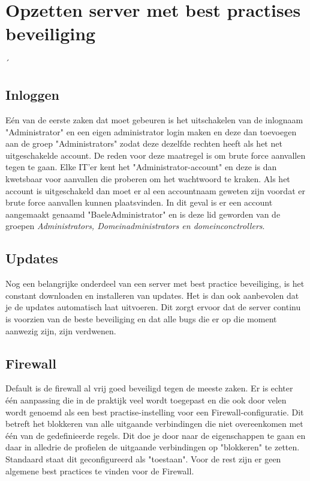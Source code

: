 \documentclass[pdftex,a4paper,12pt]{report}
\begin{document}
\chapter{Opzetten server met best practises beveiliging}
´%

\section{Inloggen}
Eén van de eerste zaken dat moet gebeuren is het uitschakelen van de inlognaam "Administrator" en een eigen administrator login maken en deze dan toevoegen aan de groep "Administrators" zodat deze dezelfde rechten heeft als het net uitgeschakelde account. De reden voor deze maatregel is om brute force aanvallen tegen te gaan. Elke IT'er kent het "Administrator-account" en deze is dan kwetsbaar voor aanvallen die proberen om het wachtwoord te kraken. Als het account is uitgeschakeld dan moet er al een accountnaam geweten zijn voordat er brute force aanvallen kunnen plaatsvinden. In dit geval is er een account aangemaakt genaamd "BaeleAdministrator" en is deze lid geworden van de groepen \textit{Administrators, Domeinadministrators en domeinconctrollers}.

\section{Updates}
Nog een belangrijke onderdeel van een server met best practice beveiliging, is het constant downloaden en installeren van updates. Het is dan ook aanbevolen dat je de updates automatisch laat uitvoeren. Dit zorgt ervoor dat de server continu is voorzien van de beste beveiliging en dat alle bugs die er op die moment aanwezig zijn, zijn verdwenen. 

\section{Firewall}
Default is de firewall al vrij goed beveiligd tegen de meeste zaken. Er is echter één aanpassing die in de praktijk veel wordt toegepast en die ook door velen wordt genoemd als een best practise-instelling voor een Firewall-configuratie. Dit betreft het blokkeren van alle uitgaande verbindingen die niet overeenkomen met één van de gedefinieerde regels. Dit doe je door naar de eigenschappen te gaan en daar in alledrie de profielen de uitgaande verbindingen op "blokkeren" te zetten. Standaard staat dit geconfigureerd als "toestaan". Voor de rest zijn er geen algemene best practices te vinden voor de Firewall.
\end{document}
